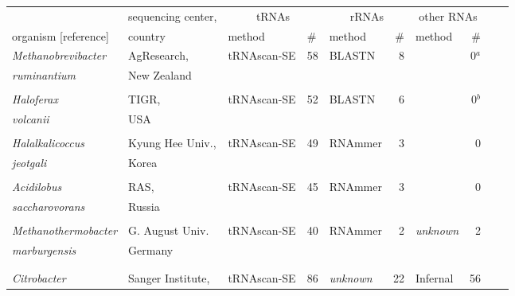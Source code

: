\begin{footnotesize}
\begin{table}
\begin{tabular}{ll|ll|lr|lr|lr}
                                         & sequencing center,& \multicolumn{2}{c|}{tRNAs} & \multicolumn{2}{c|}{rRNAs} & \multicolumn{2}{c|}{other RNAs} &  \\ \cline{3-8}
  organism [reference]                   & country           & method      & \# & method & \# & method & \# \\ \hline
\emph{Methanobrevibacter}                & AgResearch,       & tRNAscan-SE & 58 & BLASTN & 8  &      & 0$^a$& \\
\emph{ruminantium} \citep{Leahy10}        & New Zealand       &             &    &        &    &      & \\ 
& & & & & & & & \\
\emph{Haloferax}                         & TIGR,             & tRNAscan-SE & 52 & BLASTN & 6  &      & 0$^b$& \\
\emph{volcanii} \citep{Hartman10}         & USA               &             &    &        &    &      & \\  %
& & & & & & & & \\
\emph{Halalkalicoccus}                   & Kyung Hee Univ.,  & tRNAscan-SE & 49 & RNAmmer& 3  &      & 0 \\
\emph{jeotgali} \citep{Roh10}             & Korea             &             &    &        &    &      & \\ 
& & & & & & & & \\
\emph{Acidilobus}                        & RAS,              & tRNAscan-SE & 45 & RNAmmer& 3  &      & 0 \\
\emph{saccharovorans} \citep{Mardonov10}  & Russia            &             &    &        &    &      &  \\ 
& & & & & & & & \\
\emph{Methanothermobacter}               & G. August Univ.   & tRNAscan-SE & 40 & RNAmmer& 2  & \emph{unknown} &  2 \\
\emph{marburgensis} \citep{Liesegang10}   & Germany           &             &    &        &    &      & \\  %
& & & & & & & & \\
& & & & & & & & \\
\emph{Citrobacter}                       & Sanger Institute, & tRNAscan-SE & 86 & \emph{unknown} & 22 & Infernal & 56 \\

\end{tabular}
\end{table}
\end{footnotesize}
